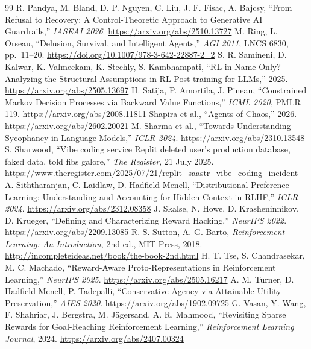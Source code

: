 \documentclass{article}
\begin{document}
\begin{thebibliography}{99}
 R. Pandya, M. Bland, D. P. Nguyen, C. Liu, J. F. Fisac, A. Bajcsy, ``From Refusal to Recovery: A Control-Theoretic Approach to Generative AI Guardrails,'' \emph{IASEAI 2026}. \url{https://arxiv.org/abs/2510.13727}
 M. Ring, L. Orseau, ``Delusion, Survival, and Intelligent Agents,'' \emph{AGI 2011}, LNCS 6830, pp.~11--20. \url{https://doi.org/10.1007/978-3-642-22887-2_2}
 S. R. Samineni, D. Kalwar, K. Valmeekam, K. Stechly, S. Kambhampati, ``RL in Name Only? Analyzing the Structural Assumptions in RL Post-training for LLMs,'' 2025. \url{https://arxiv.org/abs/2505.13697}
 H. Satija, P. Amortila, J. Pineau, ``Constrained Markov Decision Processes via Backward Value Functions,'' \emph{ICML 2020}, PMLR 119. \url{https://arxiv.org/abs/2008.11811}
 Shapira et al., ``Agents of Chaos,'' 2026. \url{https://arxiv.org/abs/2602.20021}
 M. Sharma et al., ``Towards Understanding Sycophancy in Language Models,'' \emph{ICLR 2024}. \url{https://arxiv.org/abs/2310.13548}
 S. Sharwood, ``Vibe coding service Replit deleted user's production database, faked data, told fibs galore,'' \emph{The Register}, 21 July 2025. \url{https://www.theregister.com/2025/07/21/replit_saastr_vibe_coding_incident}
 A. Siththaranjan, C. Laidlaw, D. Hadfield-Menell, ``Distributional Preference Learning: Understanding and Accounting for Hidden Context in RLHF,'' \emph{ICLR 2024}. \url{https://arxiv.org/abs/2312.08358}
 J. Skalse, N. Howe, D. Krasheninnikov, D. Krueger, ``Defining and Characterizing Reward Hacking,'' \emph{NeurIPS 2022}. \url{https://arxiv.org/abs/2209.13085}
 R. S. Sutton, A. G. Barto, \emph{Reinforcement Learning: An Introduction}, 2nd ed., MIT Press, 2018. \url{http://incompleteideas.net/book/the-book-2nd.html}
 H. T. Tse, S. Chandrasekar, M. C. Machado, ``Reward-Aware Proto-Representations in Reinforcement Learning,'' \emph{NeurIPS 2025}. \url{https://arxiv.org/abs/2505.16217}
 A. M. Turner, D. Hadfield-Menell, P. Tadepalli, ``Conservative Agency via Attainable Utility Preservation,'' \emph{AIES 2020}. \url{https://arxiv.org/abs/1902.09725}
 G. Vasan, Y. Wang, F. Shahriar, J. Bergstra, M. Jägersand, A. R. Mahmood, ``Revisiting Sparse Rewards for Goal-Reaching Reinforcement Learning,'' \emph{Reinforcement Learning Journal}, 2024. \url{https://arxiv.org/abs/2407.00324}

\end{thebibliography}
\end{document}
